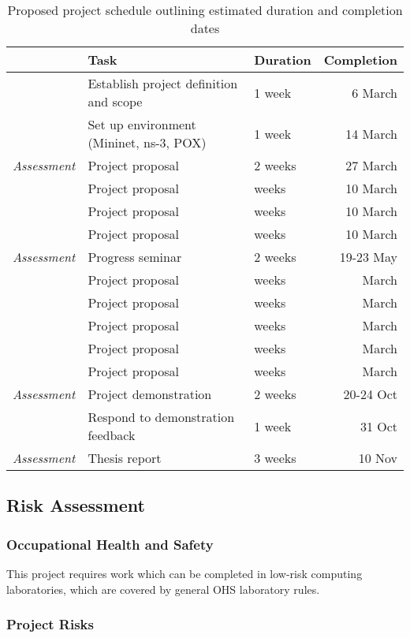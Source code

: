 \documentclass[pdftex,12pt,a4paper]{article}
\begin{document}
\begin{table}[H]
	\begin{center}
		\begin{tabular}{@{}rllr@{}}
			\toprule
			& Task & Duration & Completion\\
			\midrule
			& Establish project definition and scope & 1 week & 6 March \\
			& Set up environment (Mininet, ns-3, POX) & 1 week & 14 March \\
			\emph{Assessment} & Project proposal & 2 weeks & 27 March \\
			& Project proposal & weeks & 10 March \\
			& Project proposal & weeks & 10 March \\
			& Project proposal & weeks & 10 March \\
			\emph{Assessment} & Progress seminar & 2 weeks & 19-23 May \\
			& Project proposal & weeks & March \\
			& Project proposal & weeks & March \\
			& Project proposal & weeks & March \\
			& Project proposal & weeks & March \\
			& Project proposal & weeks & March \\
			\emph{Assessment} & Project demonstration & 2 weeks & 20-24 Oct \\
			& Respond to demonstration feedback & 1 week & 31 Oct \\
			\emph{Assessment} & Thesis report & 3 weeks & 10 Nov \\
			\bottomrule
		\end{tabular}
		\caption{Proposed project schedule outlining estimated duration and completion dates}
	\end{center}
\end{table}

\subsection{Risk Assessment}
\subsubsection{Occupational Health and Safety}
This project requires work which can be completed in low-risk computing laboratories, which are covered by general OHS laboratory rules.

\subsubsection{Project Risks}
\end{document}
